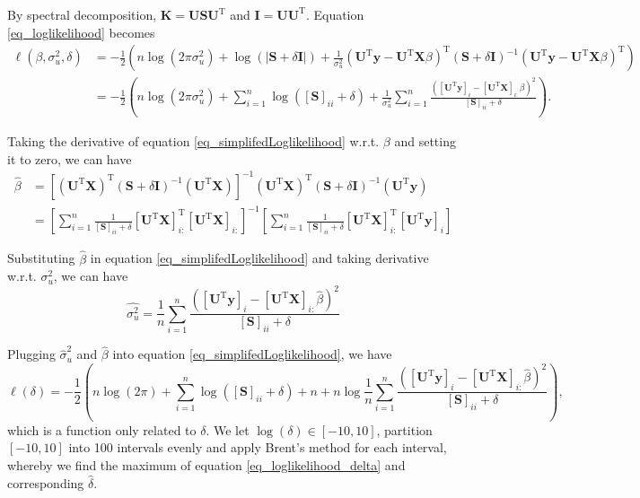 \documentclass{article}
\begin{document}
By spectral decomposition, $ \mathbf{K = USU}^{\mathrm{T}} $ and $ \mathbf{I = UU}^{\mathrm{T}} $. Equation \ref{eq_loglikelihood} becomes
\begin{align}
		\ell(\beta, \sigma^{2}_{u}, \delta) &= -\frac{1}{2} \left( n \log(2 \pi \sigma^{2}_{u}) + \log(|\mathbf{S} + \delta \mathbf{I}|) +  \frac{1}{\sigma^{2}_{u}} (\mathbf{U}^{\mathrm{T}}\mathbf{y} -  \mathbf{U}^{\mathrm{T}}\mathbf{X}\beta)^{\mathrm{T}} (\mathbf{S} + \delta \mathbf{I})^{-1} (\mathbf{U}^{\mathrm{T}}\mathbf{y} -  \mathbf{U}^{\mathrm{T}}\mathbf{X}\beta)^{\mathrm{T}} \right) \\
		\label{eq_simplifedLoglikelihood} &=  -\frac{1}{2} \left(n \log(2 \pi \sigma^{2}_{u}) + \sum_{i=1}^{n}\log([\mathbf{S}]_{ii} + \delta) +  \frac{1}{\sigma^{2}_{u}} \sum_{i=1}^{n} \frac{([\mathbf{U}^{\mathrm{T}}\mathbf{y}]_{i} - [\mathbf{U}^{\mathrm{T}}\mathbf{X}]_{i:}\beta)^{2}}{[\mathbf{S}]_{ii} + \delta}\right).
\end{align}

Taking the derivative of equation \ref{eq_simplifedLoglikelihood} w.r.t. $ \beta $ and setting it to zero, we can have
\begin{align}
	\hat{\beta} &= [(\mathbf{U}^{\mathrm{T}}\mathbf{X})^{\mathrm{T}} (\mathbf{S} + \delta \mathbf{I})^{-1} (\mathbf{U}^{\mathrm{T}}\mathbf{X})]^{-1}  (\mathbf{U}^{\mathrm{T}}\mathbf{X})^{\mathrm{T}} (\mathbf{S} + \delta \mathbf{I})^{-1} (\mathbf{U}^{\mathrm{T}}\mathbf{y})\\
	\label{eq_beta} &= \left[ \sum_{i=1}^{n} \frac{1}{[\mathbf{S}]_{ii} + \delta} [\mathbf{U}^{\mathrm{T}}\mathbf{X}]_{i:}^{\mathrm{T}} [\mathbf{U}^{\mathrm{T}}\mathbf{X}]_{i:}\right]^{-1} \left[ \sum_{i=1}^{n} \frac{1}{[\mathbf{S}]_{ii} + \delta} [\mathbf{U}^{\mathrm{T}}\mathbf{X}]_{i:}^{\mathrm{T}} [\mathbf{U}^{\mathrm{T}}\mathbf{y}]_{i}\right]
\end{align}

Substituting $ \hat{\beta} $ in equation \ref{eq_simplifedLoglikelihood} and taking derivative w.r.t. $ \sigma^{2}_{u} $, we can have
\begin{equation}\label{eq_sigma_u}
	\hat{\sigma^{2}_{u}} = \frac{1}{n} \sum_{i=1}^{n} \frac{([\mathbf{U}^{\mathrm{T}}\mathbf{y}]_{i} - [\mathbf{U}^{\mathrm{T}}\mathbf{X}]_{i:}\hat{\beta})^{2}}{[\mathbf{S}]_{ii} + \delta}
\end{equation}

Plugging $ \hat{\sigma}^{2}_{u} $ and $ \hat{\beta} $ into equation \ref{eq_simplifedLoglikelihood}, we have
\begin{equation}\label{eq_loglikelihood_delta}
	\ell(\delta) = -\frac{1}{2} \left( n\log(2\pi) + \sum_{i=1}^{n}\log([\mathbf{S}]_{ii} + \delta)+ n + n\log \frac{1}{n} \sum_{i=1}^{n} \frac{([\mathbf{U}^{\mathrm{T}}\mathbf{y}]_{i} - [\mathbf{U}^{\mathrm{T}}\mathbf{X}]_{i:}\hat{\beta})^{2}}{[\mathbf{S}]_{ii} + \delta} \right),
\end{equation}
which is a function only related to $ \delta $. We let $ \log(\delta) \in [-10, 10] $, partition $ [-10, 10] $ into 100 intervals evenly and apply Brent's method for each interval, whereby we find the maximum of equation \ref{eq_loglikelihood_delta} and corresponding $ \hat{\delta} $.
\end{document}
